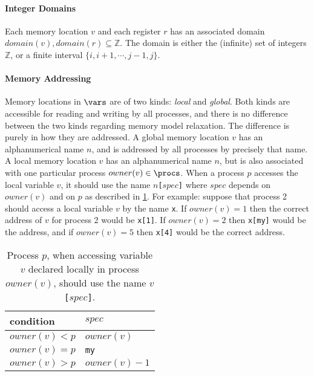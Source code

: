 \documentclass[a4paper]{article}
\begin{document}
\paragraph{Integer Domains}
Each memory location $v$ and each register $r$ has an associated
domain $domain(v), domain(r) \subseteq\mathbb{Z}$. The domain is
either the (infinite) set of integers $\mathbb{Z}$, or a finite
interval $\{i,i+1,\cdots,j-1,j\}$.

\paragraph{Memory Addressing}
Memory locations in $\vars$ are of two kinds: \emph{local} and
\emph{global}. Both kinds are accessible for reading and writing by
all processes, and there is no difference between the two kinds
regarding memory model relaxation. The difference is purely in how
they are addressed. A global memory location $v$ has an alphanumerical
name $n$, and is addressed by all processes by precisely that name. A
local memory location $v$ has an alphanumerical name $n$, but is also
associated with one particular process $owner(v)\in\procs$. When a
process $p$ accesses the local variable $v$, it should use the name
$n$\verb+[+$spec$\verb+]+ where $spec$ depends on $owner(v)$ and on
$p$ as described in \cref{tbl:locvarnames}. For example: suppose that
process 2 should access a local variable $v$ by the name \verb+x+. If
$owner(v) = 1$ then the correct address of $v$ for process 2 would be
\verb+x[1]+. If $owner(v) = 2$ then \verb+x[my]+ would be the address,
and if $owner(v) = 5$ then \verb+x[4]+ would be the correct address.

\begin{table}[ht]
  \begin{center}
    \begin{tabular}{|l|l|}
      \hline
      condition & $spec$\\
      \hline
      $owner(v) < p$ & $owner(v)$\\
      $owner(v) = p$ & \verb+my+\\
      $owner(v) > p$ & $owner(v)-1$\\
      \hline
    \end{tabular}
  \end{center}
  \caption{Process $p$, when accessing variable $v$ declared locally
    in process $owner(v)$, should use the name
    $v${\tt [}$spec${\tt ]}.}
  \label{tbl:locvarnames}
\end{table}
\end{document}
